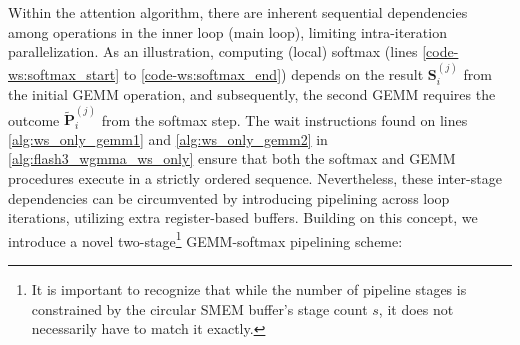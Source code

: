 Within the attention algorithm, there are inherent sequential dependencies among operations in the inner loop (main loop), limiting intra-iteration parallelization. As an illustration, computing (local) softmax (lines \ref{code-ws:softmax_start} to \ref{code-ws:softmax_end}) depends on the result $\mathbf{S}_i^{(j)}$ from the initial GEMM operation, and subsequently, the second GEMM requires the outcome $\widetilde{\mathbf{P}}_i^{(j)}$ from the softmax step. The wait instructions found on lines \ref{alg:ws_only_gemm1} and \ref{alg:ws_only_gemm2} in \cref{alg:flash3_wgmma_ws_only} ensure that both the softmax and GEMM procedures execute in a strictly ordered sequence. Nevertheless, these inter-stage dependencies can be circumvented by introducing pipelining across loop iterations, utilizing extra register-based buffers. Building on this concept, we introduce a novel two-stage\footnote{It is important to recognize that while the number of pipeline stages is constrained by the circular SMEM buffer’s stage count $s$, it does not necessarily have to match it exactly.} GEMM-softmax pipelining scheme:

